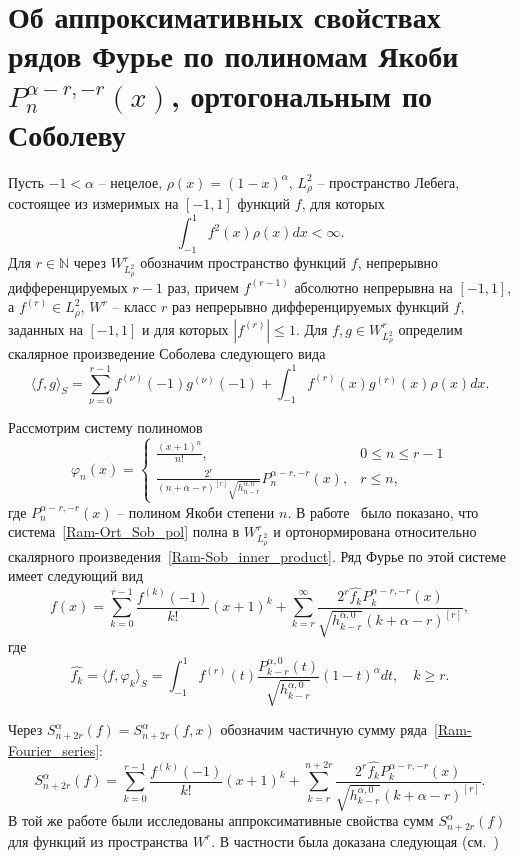 ﻿\section{Об аппроксимативных свойствах рядов Фурье по полиномам Якоби \texorpdfstring{\linebreak$P_n^{\alpha-r,-r}(x)$}{}, ортогональным по Соболеву}\label{Ram-Jac}
Пусть $-1<\alpha$ -- нецелое, $\rho(x)=(1-x)^\alpha$, $L_\rho^2$ -- пространство Лебега, состоящее из измеримых на $[-1,1]$ функций $f$, для которых
$$
\int_{-1}^{1}f^2(x)\rho(x)dx<\infty.
$$
Для $r\in\mathbb{N}$ через $W^r_{L_\rho^2}$ обозначим пространство функций $f$, непрерывно дифференцируемых $r-1$ раз, причем $f^{(r-1)}$ абсолютно непрерывна на $[-1,1]$, а $f^{(r)}\in L_\rho^2$, $W^r$ -- класс $r$ раз непрерывно дифференцируемых функций $f$, заданных на $[-1,1]$ и для которых $|f^{(r)}|\le 1$.
Для $f,g\in W^r_{L_\rho^2}$ определим скалярное произведение Соболева следующего вида
\begin{equation}\label{Ram-Sob_inner_product}
\langle f,g\rangle_S=\sum_{\nu=0}^{r-1}f^{(\nu)}(-1)g^{(\nu)}(-1)+\int_{-1}^{1}f^{(r)}(x)g^{(r)}(x)\rho(x)dx.
\end{equation}

Рассмотрим систему полиномов
\begin{equation}\label{Ram-Ort_Sob_pol}
	\varphi_n(x)=
	\begin{cases}
		\frac{(x+1)^n}{n!}, & 0\le n\le r-1 \\
		\frac{2^r}{(n+\alpha-r)^{[r]}\sqrt{h_{n-r}^{\alpha,0}}}P_n^{\alpha-r,-r}(x), & r\le n,
	\end{cases}
\end{equation}
где $P_n^{\alpha-r,-r}(x)$ -- полином Якоби степени $n$. В работе~\cite{mmg-Shii-matzam2017} было показано, что система~\eqref{Ram-Ort_Sob_pol} полна в $W^r_{L_\rho^2}$ и ортонормирована относительно скалярного произведения~\eqref{Ram-Sob_inner_product}. Ряд Фурье по этой системе имеет следующий вид
\begin{equation}\label{Ram-Fourier_series} f(x)=\sum_{k=0}^{r-1}\frac{f^{(k)}(-1)}{k!}(x+1)^k+\sum_{k=r}^{\infty}\frac{2^r\widehat{f_k}P_k^{\alpha-r,-r}(x)}{\sqrt{h_{k-r}^{\alpha,0}}(k+\alpha-r)^{[r]}},
\end{equation}
где
$$
\widehat{f_k}=\langle f,\varphi_k\rangle_S=\int_{-1}^{1}f^{(r)}(t)\frac{P_{k-r}^{\alpha,0}(t)}{\sqrt{h_{k-r}^{\alpha,0}}}(1-t)^\alpha dt, \quad k\ge r.
$$

Через $S^\alpha_{n+2r}(f)=S^\alpha_{n+2r}(f,x)$ обозначим частичную сумму ряда~\eqref{Ram-Fourier_series}:
$$
S^\alpha_{n+2r}(f)=\sum_{k=0}^{r-1}\frac{f^{(k)}(-1)}{k!}(x+1)^k+
\sum_{k=r}^{n+2r}\frac{2^r\widehat{f_k}P_k^{\alpha-r,-r}(x)}{\sqrt{h_{k-r}^{\alpha,0}}(k+\alpha-r)^{[r]}}.
$$
В той же работе были исследованы аппроксимативные свойства сумм $S^\alpha_{n+2r}(f)$ для функций из пространства $W^r$. В частности была доказана следующая (см.~\cite[теорема 4]{mmg-Shii-matzam2017})

